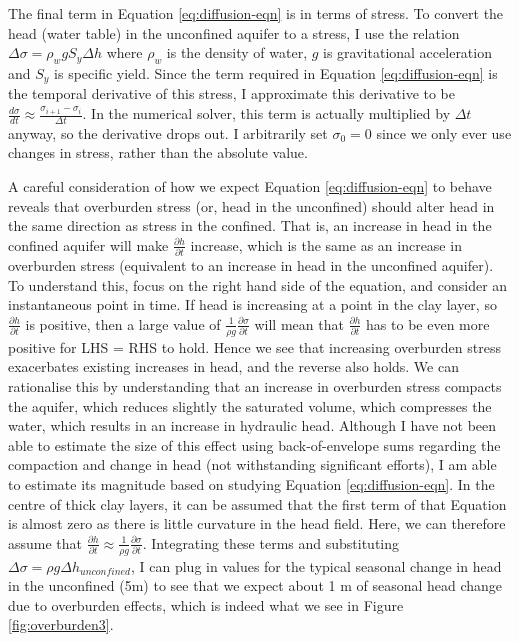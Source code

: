 \documentclass{article}
\begin{document}
The final term in Equation \ref{eq:diffusion-eqn} is in terms of stress. To convert the head (water table) in the unconfined aquifer to a stress, I use the relation $\Delta \sigma = \rho_w g S_y \Delta h$ where $\rho_w$ is the density of water, $g$ is gravitational acceleration and $S_y$ is specific yield. Since the term required in Equation \ref{eq:diffusion-eqn} is the temporal derivative of this stress, I approximate this derivative to be $\frac{d\sigma}{dt} \approx \frac{\sigma_{i+1} - \sigma_{i}}{\Delta t}$. In the numerical solver, this term is actually multiplied by $\Delta t$ anyway, so the derivative drops out. I arbitrarily set $\sigma_0 = 0$ since we only ever use changes in stress, rather than the absolute value. 

A careful consideration of how we expect Equation \ref{eq:diffusion-eqn} to behave reveals that overburden stress (or, head in the unconfined) should alter head in the same direction as stress in the confined. That is, an increase in head in the confined aquifer will make $\frac{\partial{h}}{\partial{t}}$ increase, which is the same as an increase in overburden stress (equivalent to an increase in head in the unconfined aquifer). To understand this, focus on the right hand side of the equation, and consider an instantaneous point in time. If head is increasing at a point in the clay layer, so $\frac{\partial{h}}{\partial{t}}$ is positive, then a large value of $ \frac{1}{\rho g} \frac{\partial \sigma}{\partial t}$ will mean that $\frac{\partial{h}}{\partial{t}}$ has to be even more positive for LHS = RHS to hold. Hence we see that increasing overburden stress exacerbates existing increases in head, and the reverse also holds. We can rationalise this by understanding that an increase in overburden stress compacts the aquifer, which reduces slightly the saturated volume, which compresses the water, which results in an increase in hydraulic head. Although I have not been able to estimate the size of this effect using back-of-envelope sums regarding the compaction and change in head (not withstanding significant efforts), I am able to estimate its magnitude based on studying Equation \ref{eq:diffusion-eqn}. In the centre of thick clay layers, it can be assumed that the first term of that Equation is almost zero as there is little curvature in the head field. Here, we can therefore assume that $  \frac{\partial h}{\partial t} \approx \frac{1}{\rho g} \frac{\partial \sigma}{\partial t} $. Integrating these terms and substituting $ \Delta \sigma = \rho g \Delta h_{unconfined} $, I can plug in values for the typical seasonal change in head in the unconfined (5m) to see that we expect about 1 m of seasonal head change due to overburden effects, which is indeed what we see in Figure \ref{fig:overburden3}.
\end{document}
